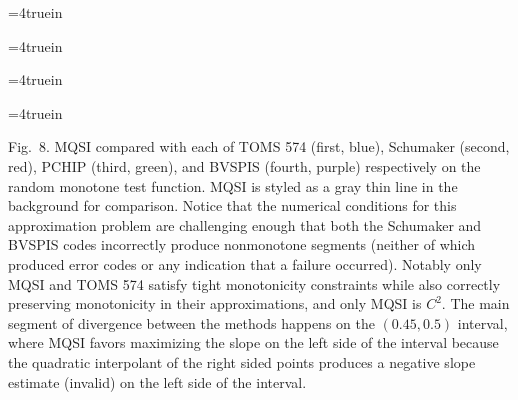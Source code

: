 \topinsert
\centerline{\epsfxsize=4truein }
\centerline{\epsfxsize=4truein }
\centerline{\epsfxsize=4truein }
\centerline{\epsfxsize=4truein }
{\narrower\noindent\rmVIII Fig.\ 8.
{\ttVIII MQSI} compared with each of TOMS 574 (first, blue), Schumaker
(second, red), {\ttVIII PCHIP} (third, green), and {\ttVIII BVSPIS}
(fourth, purple) respectively on the {\itVIII random monotone} test
function. {\ttVIII MQSI} is styled as a gray thin line in the
background for comparison. Notice that the numerical conditions for
this approximation problem are challenging enough that both the
Schumaker and {\ttVIII BVSPIS} codes incorrectly produce nonmonotone
segments (neither of which produced error codes or any indication that
a failure occurred). Notably only {\ttVIII MQSI} and TOMS 574 satisfy
tight monotonicity constraints while also correctly preserving
monotonicity in their approximations, and only {\ttVIII MQSI} is
$C^2$. The main segment of divergence between the methods happens on
the $(0.45, 0.5)$ interval, where {\ttVIII MQSI} favors maximizing the
slope on the left side of the interval because the quadratic
interpolant of the right sided points produces a negative
slope estimate (invalid) on the left side of the interval.
\par}
\endinsert
